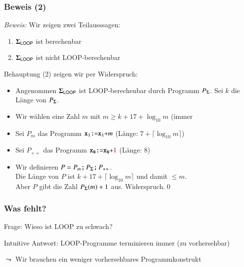 \documentclass[onlymath]{beamer}
\begin{document}
\begin{frame}[t]\frametitle{Beweis (2)}


\emph{Beweis:} Wir zeigen zwei Teilausssagen:

\begin{enumerate}[(1)]
\item $\boldsymbol{\Sigma}_{\textsf{LOOP}}$ ist berechenbar
\item $\boldsymbol{\Sigma}_{\textsf{LOOP}}$ ist nicht LOOP-berechenbar
\end{enumerate}\pause

Behauptung (2) zeigen wir per Widerspruch:\pause
\begin{itemize}
\item Angenommen $\boldsymbol{\Sigma}_{\textsf{LOOP}}$ ist LOOP-berechenbar durch Programm $P_{\boldsymbol{\Sigma}}$. Sei $k$ die Länge von $P_{\boldsymbol{\Sigma}}$.\pause
\item Wir wählen eine Zahl $m$ mit $m\geq k+17+\log_{10} m$ (immer \pause
\item Sei $P_m$ das Programm $\texttt{x}_{\texttt{1}}\texttt{:=}\texttt{x}_{\texttt{1}}\texttt{+}m$ (Länge: $7+\lceil\log_{10}m\rceil$)\pause
\item Sei $P_{++}$ das Programm $\texttt{x}_{\texttt{0}}\texttt{:=}\texttt{x}_{\texttt{0}}\texttt{+}\textcolor{purple}{1}$ (Länge: $8$)\pause
\item Wir definieren $P = P_m\texttt{;}\, P_{\boldsymbol{\Sigma}}\texttt{;}\, P_{++}$.\\\pause
Die Länge von $P$ ist $k+17+\lceil\log_{10}m\rceil$ und damit $\leq m$.\\\pause
Aber $P$ gibt die Zahl $P_{\boldsymbol{\Sigma}}(m)+1$ aus. 
Widerspruch.\qed
\end{itemize}

\end{frame}


\begin{frame}\frametitle{Was fehlt?}

\alert{Frage:} Wieso ist LOOP zu schwach?\medskip\pause

\alert{Intuitive Antwort:} LOOP-Programme terminieren immer (zu vorhersehbar)
\bigskip

$\leadsto$ Wir brauchen ein weniger vorhersehbares Programmkonstrukt

\end{frame}
\end{document}
